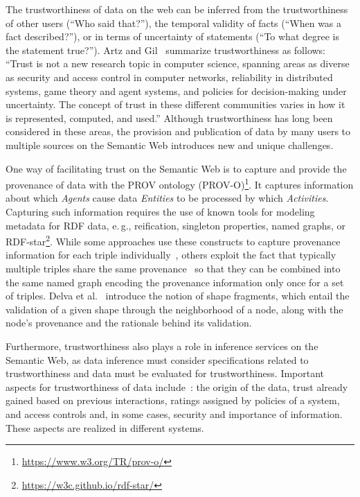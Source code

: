 \documentclass[a4paper,USenglish]{tgdk-v2021}
\begin{document}
The trustworthiness of data on the web can be inferred from the trustworthiness of other users (``Who said that?''), the temporal validity of facts (``When was a fact described?''), or in terms of uncertainty of statements (``To what degree is the statement true?'').
Artz and Gil~\cite{DBLP:journals/ws/ArtzG07} summarize trustworthiness as follows:
``Trust is not a new research topic in computer science, spanning areas as diverse as security and access control in computer networks, reliability in distributed systems, game theory and agent systems, and policies for decision-making under uncertainty. The concept of trust in these different communities varies in how it is represented, computed, and used.''
Although trustworthiness has long been considered in these areas, the provision and publication of data by many users to multiple sources on the Semantic Web introduces new and unique challenges.

One way of facilitating trust on the Semantic Web is to capture and provide the provenance of data with the PROV ontology (PROV-O)\footnote{\url{https://www.w3.org/TR/prov-o/}}.
It captures information about which \emph{Agents} cause data \emph{Entities} to be processed by which \emph{Activities}.
Capturing such information requires the use of known tools for modeling metadata for RDF data, e.\,g., reification, singleton properties, named graphs, or RDF-star\footnote{\url{https://w3c.github.io/rdf-star/}}.
While some approaches use these constructs to capture provenance information for each triple individually~\cite{DBLP:conf/semweb/GalarragaMH17}, 
others exploit the fact that typically multiple triples share the same provenance~\cite{DBLP:conf/semweb/HansenLGLTH20} so that they can be combined into the same named graph encoding the provenance information only once for a set of triples.
Delva et al.~\cite{DBLP:conf/edbt/DelvaDJB23} introduce the notion of shape fragments, which entail the validation of a given shape through the neighborhood of a node, along with the node's provenance and the rationale behind its validation.

Furthermore, trustworthiness also plays a role in inference services on the Semantic Web, as data inference must consider specifications related to trustworthiness and data must be evaluated for trustworthiness.
Important aspects for trustworthiness of data include~\cite{DBLP:journals/ws/ArtzG07}:
the origin of the data, 
trust already gained based on previous interactions, 
ratings assigned by policies of a system, and 
access controls and, in some cases, security and importance of information.
These aspects are realized in different systems.
\end{document}
